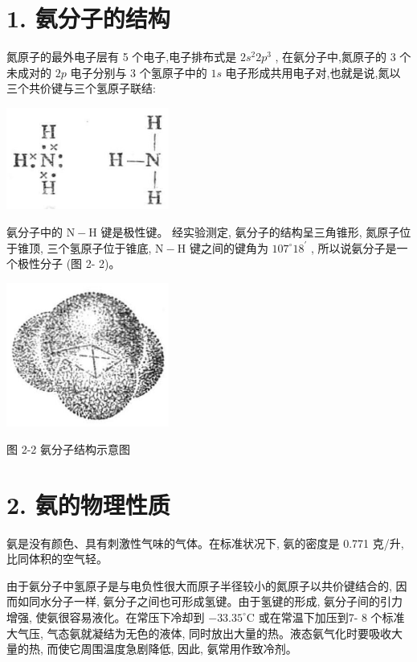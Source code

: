 \documentclass[10pt]{article}
\begin{document}
\section*{1. 氨分子的结构}

氮原子的最外电子层有 5 个电子,电子排布式是 \(2{s}^{2}2{p}^{3}\) , 在氨分子中,氮原子的 3 个未成对的 \({2p}\) 电子分别与 3 个氢原子中的 \({1s}\) 电子形成共用电子对,也就是说,氮以三个共价键与三个氢原子联结:

\begin{center}
\includegraphics[max width=0.4\textwidth]{images/01912d13-9986-7822-a012-3f3f7be99dcb_41_254205.jpg}
\end{center}

氨分子中的 \(\mathrm{N} - \mathrm{H}\) 键是极性键。 经实验测定, 氨分子的结构呈三角锥形, 氮原子位于锥顶, 三个氢原子位于锥底, \(\mathrm{N} - \mathrm{H}\) 键之间的键角为 \({107}^{ \circ }{18}^{\prime }\) , 所以说氨分子是一个极性分子 (图 2- 2)。

\begin{center}
\includegraphics[max width=0.4\textwidth]{images/01912d13-9986-7822-a012-3f3f7be99dcb_41_738932.jpg}
\end{center}

图 2-2 氨分子结构示意图

\section*{2. 氨的物理性质}

氨是没有颜色、具有刺激性气味的气体。在标准状况下, 氨的密度是 0.771 克/升, 比同体积的空气轻。

由于氨分子中氢原子是与电负性很大而原子半径较小的氮原子以共价键结合的, 因而如同水分子一样, 氨分子之间也可形成氢键。由于氢键的形成, 氨分子间的引力增强, 使氨很容易液化。在常压下冷却到 \(- {33.35}^{ \circ }\mathrm{C}\) 或在常温下加压到7- 8 个标准大气压, 气态氨就凝结为无色的液体, 同时放出大量的热。液态氨气化时要吸收大量的热, 而使它周围温度急剧降低, 因此, 氨常用作致冷剂。
\end{document}
